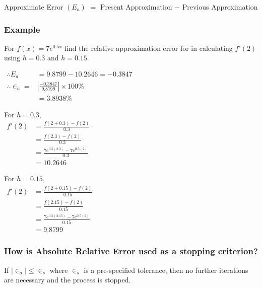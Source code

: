 \begin{center}
   Approximate Error $(E_a)$ $=$ Present Approximation $-$ Previous Approximation
\end{center}

\subsubsection{Example}
For $f(x) = 7e^{0.5x}$ find the relative approximation error for in calculating $f'(2)$ using $h=0.3$ and  $h=0.15$.

\begin{minipage}[T]{0.45\textwidth}
   $\begin{aligned}
      \therefore E_a & = 9.8799 - 10.2646 = -0.3847 \\[3ex]
      \therefore \in_a = & \left| \frac{-0.3847}{9.8799} \right| \times 100\% \\
      & = 3.8938\%
   \end{aligned}$
\end{minipage}\vrule\hfill
\begin{minipage}[T]{0.25\textwidth}
   For $h=0.3$,\\

   $\begin{aligned}
      f'(2) & = \frac{f(2+0.3) - f(2)}{0.3} \\
      & = \frac{f(2.3) - f(2)}{0.3} \\
      & = \frac{7e^{0.5(2.3)} - 7e^{0.5(2)}}{0.3} \\
      & = 10.2646
   \end{aligned}$
\end{minipage}
\begin{minipage}[T]{0.25\textwidth}
   For $h=0.15$,\\

   $\begin{aligned}
      f'(2) & = \frac{f(2+0.15) - f(2)}{0.15} \\
      & = \frac{f(2.15) - f(2)}{0.15} \\
      & = \frac{7e^{0.5(2.15)} - 7e^{0.5(2)}}{0.15} \\
      & = 9.8799
   \end{aligned}$
\end{minipage}


\subsubsection{How is Absolute Relative Error used as a
stopping criterion?}
If
$|\in_a| \leq \in_s$ where $\in_s$ is a pre-specified tolerance, then no further iterations are necessary and the process is stopped.

